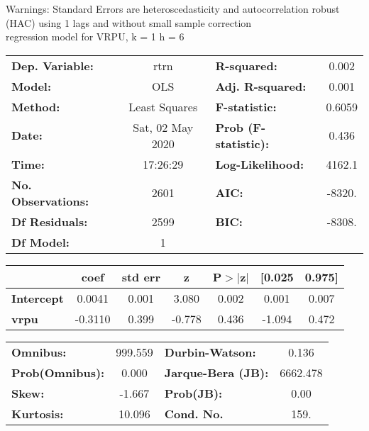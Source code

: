 Warnings: \newline
 [1] Standard Errors are heteroscedasticity and autocorrelation robust (HAC) using 1 lags and without small sample correction\\ 

regression model for VRPU, k = 1 h = 6\begin{center}
\begin{tabular}{lclc}
\toprule
\textbf{Dep. Variable:}    &       rtrn       & \textbf{  R-squared:         } &     0.002   \\
\textbf{Model:}            &       OLS        & \textbf{  Adj. R-squared:    } &     0.001   \\
\textbf{Method:}           &  Least Squares   & \textbf{  F-statistic:       } &    0.6059   \\
\textbf{Date:}             & Sat, 02 May 2020 & \textbf{  Prob (F-statistic):} &    0.436    \\
\textbf{Time:}             &     17:26:29     & \textbf{  Log-Likelihood:    } &    4162.1   \\
\textbf{No. Observations:} &        2601      & \textbf{  AIC:               } &    -8320.   \\
\textbf{Df Residuals:}     &        2599      & \textbf{  BIC:               } &    -8308.   \\
\textbf{Df Model:}         &           1      & \textbf{                     } &             \\
\bottomrule
\end{tabular}
\begin{tabular}{lcccccc}
                   & \textbf{coef} & \textbf{std err} & \textbf{z} & \textbf{P$> |$z$|$} & \textbf{[0.025} & \textbf{0.975]}  \\
\midrule
\textbf{Intercept} &       0.0041  &        0.001     &     3.080  &         0.002        &        0.001    &        0.007     \\
\textbf{vrpu}      &      -0.3110  &        0.399     &    -0.778  &         0.436        &       -1.094    &        0.472     \\
\bottomrule
\end{tabular}
\begin{tabular}{lclc}
\textbf{Omnibus:}       & 999.559 & \textbf{  Durbin-Watson:     } &    0.136  \\
\textbf{Prob(Omnibus):} &   0.000 & \textbf{  Jarque-Bera (JB):  } & 6662.478  \\
\textbf{Skew:}          &  -1.667 & \textbf{  Prob(JB):          } &     0.00  \\
\textbf{Kurtosis:}      &  10.096 & \textbf{  Cond. No.          } &     159.  \\
\bottomrule
\end{tabular}
\end{center}

